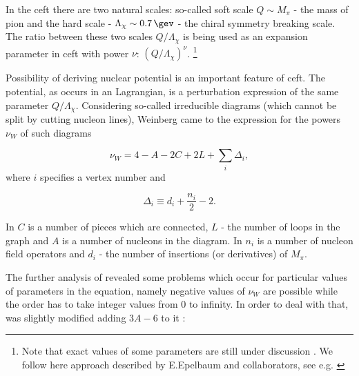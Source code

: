 In the \gls{ceft} there are two natural scales: so-called soft scale $Q \sim M_\pi$  -
the mass of pion and the hard scale -
$\Lambda_\chi \sim \SI{0.7}{\gev}$ - the chiral symmetry breaking scale.
The ratio between these two scales $Q/\Lambda_\chi$
is being used as an expansion parameter in  \gls{ceft} with power
$\nu$: $\left(Q/\Lambda_\chi\right)^\nu$.
\footnote{Note that exact values of some parameters are still under discussion \cite{Epelbaum2004}. We follow here approach described by E.Epelbaum and collaborators, see e.g. \cite{reinkrebs2018}}

Possibility of deriving nuclear potential is an important feature of \gls{ceft}.
The potential, as occurs in an Lagrangian, is a perturbation expression of the same parameter $Q/\Lambda_\chi$.
Considering so-called irreducible diagrams (which cannot be split
by cutting nucleon lines), Weinberg \cite{WEINBERG1990,WEINBERG1991}
came to the expression for the powers $\nu_W$ of such diagrams

\begin{equation}
    \nu_W = 4 - A - 2C + 2L + \sum_i \Delta_i,
    \label{powers}
\end{equation}
where $i$ specifies a vertex number and

\begin{equation}
    \Delta_i \equiv d_i + \frac{n_i}{2} - 2.
    \label{Delta}
\end{equation}

In  $C$ is a number of pieces which are connected, $L$ - the number of loops in the graph
and $A$ is a number of nucleons in the diagram.
In  $n_i$ is a number of nucleon field operators and $d_i$ - the number of insertions
(or derivatives) of  $M_\pi$.

The further analysis of  revealed some problems which occur 
for particular values of parameters in the equation, namely negative values of $\nu_W$ 
are possible while the order has to take integer values from 0 to infinity.
In order to deal with that,  
was slightly modified adding $3A - 6$ to it  \cite{Machleidt2011, EPELBAUM2006_PROGRESS}:

